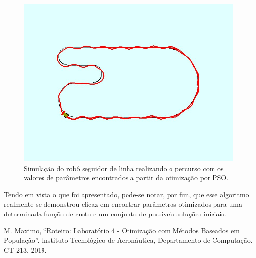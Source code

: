 \documentclass[conference]{IEEEtran}
\begin{document}
\begin{figure}[htbp]
\centering
\centerline{\includegraphics[scale=0.3]{line_follower_solution.jpeg}}
\caption{Simulação do robô seguidor de linha realizando o percurso com os valores de parâmetros encontrados a partir da otimização por PSO.}
\label{line_follower_solution}
\end{figure}

Tendo em vista o que foi apresentado, pode-se notar, por fim, que esse algoritmo realmente se demonstrou eficaz em encontrar parâmetros otimizados para uma determinada função de custo e um conjunto de possíveis soluções iniciais.

\begin{thebibliography}{00}
 M. Maximo, ``Roteiro: Laboratório 4 - Otimização com Métodos Baseados em População''. Instituto Tecnológico de Aeronáutica, Departamento de Computação. CT-213, 2019.
\end{thebibliography}
\end{document}
